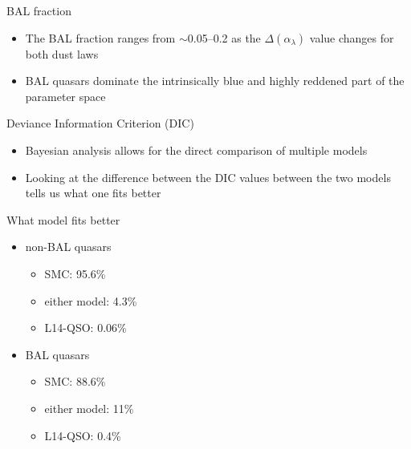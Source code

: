 \documentclass[landscape,9pt]{beamer}
\begin{document}
\begin{frame}
\begin{columns}
\begin{column}{0.4\textwidth}
		\end{column}
	\end{columns}
	\vspace{-2mm}
	\begin{block}{BAL fraction}
		\begin{itemize}
			\item{The BAL fraction ranges from $\sim$0.05--0.2 as the $\Delta(\alpha_\lambda)$ value changes for both dust laws}
			\item{BAL quasars dominate the intrinsically blue and highly reddened part of the parameter space}
		\end{itemize}
	\end{block}
\end{frame}

\begin{frame}
	\vspace{-2mm}
	\begin{block}{Deviance Information Criterion (DIC)}
		\begin{itemize}
			\item{Bayesian analysis allows for the direct comparison of multiple models}
			\item{Looking at the difference between the DIC values between the two models tells us what one fits better}
		\end{itemize}
	\end{block}
	\begin{block}{What model fits better}
	\begin{itemize}
		\item{non-BAL quasars}
		\begin{itemize}
			\item{SMC: 95.6\%}
			\item{either model: 4.3\%}
			\item{L14-QSO: 0.06\%}
		\end{itemize}
		\item{BAL quasars}
		\begin{itemize}
			\item{SMC: 88.6\%}
			\item{either model: 11\%}
			\item{L14-QSO: 0.4\%}
		\end{itemize}
	\end{itemize}
	\end{block}
\end{frame}
\end{document}
